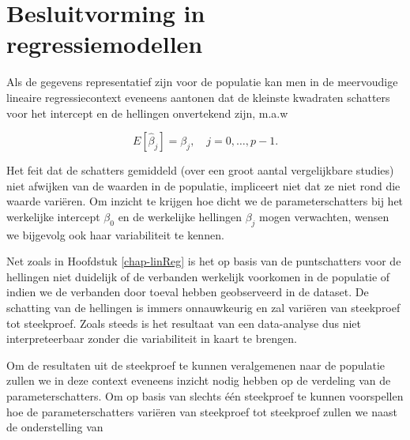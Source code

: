 \documentclass[
  12pt,dutch,coursenotes]{book}
\begin{document}
\hypertarget{besluitvorming-in-regressiemodellen}{%
\section{Besluitvorming in regressiemodellen}\label{besluitvorming-in-regressiemodellen}}

Als de gegevens representatief zijn voor de populatie kan men in de meervoudige lineaire regressiecontext eveneens aantonen dat de kleinste kwadraten schatters voor het intercept en de hellingen onvertekend zijn, m.a.w

\[E[\hat \beta_j]=\beta_j,\quad j=0,\ldots,p-1.\]

Het feit dat de schatters gemiddeld (over een groot aantal vergelijkbare studies) niet afwijken van de waarden in de populatie, impliceert niet dat ze niet rond die waarde variëren.
Om inzicht te krijgen hoe dicht we de parameterschatters bij het werkelijke intercept \(\beta_0\) en de werkelijke hellingen \(\beta_j\) mogen verwachten, wensen we bijgevolg ook haar variabiliteit te kennen.

Net zoals in Hoofdstuk \ref{chap-linReg} is het op basis van de puntschatters voor de hellingen niet duidelijk of de verbanden werkelijk voorkomen in de populatie of indien we de verbanden door toeval hebben geobserveerd in de dataset.
De schatting van de hellingen is immers onnauwkeurig en zal variëren van steekproef tot steekproef.
Zoals steeds is het resultaat van een data-analyse dus niet interpreteerbaar zonder die variabiliteit in kaart te brengen.

Om de resultaten uit de steekproef te kunnen veralgemenen naar de populatie zullen we in deze context eveneens inzicht nodig hebben op de verdeling van de parameterschatters.
Om op basis van slechts één steekproef te kunnen voorspellen hoe de parameterschatters variëren van steekproef tot steekproef zullen we naast de onderstelling van
\end{document}
